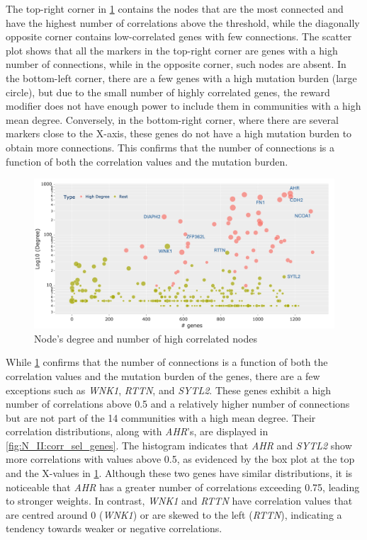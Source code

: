 The top-right corner in \cref{fig:N_II:degree_high_corr} contains the nodes that are the most connected and have the highest number of correlations above the threshold, while the diagonally opposite corner contains low-correlated genes with few connections. The scatter plot shows that all the markers in the top-right corner are genes with a high number of connections, while in the opposite corner, such nodes are absent. In the bottom-left corner, there are a few genes with a high mutation burden (large circle), but due to the small number of highly correlated genes, the reward modifier does not have enough power to include them in communities with a high mean degree. Conversely, in the bottom-right corner, where there are several markers close to the X-axis, these genes do not have a high mutation burden to obtain more connections. This confirms that the number of connections is a function of both the correlation values and the mutation burden.


\begin{figure}[!htb]    
    \centering
    \includegraphics[width=1.0\textwidth,height=1.0\textheight,keepaspectratio]{Sections/Network_II/resources/reward/Degree_highCorrGenes_labeled.png}
    \caption{Node's degree and number of high correlated nodes}
    \label{fig:N_II:degree_high_corr}
\end{figure}


While \cref{fig:N_II:degree_high_corr} confirms that the number of connections is a function of both the correlation values and the mutation burden of the genes, there are a few exceptions such as \textit{WNK1}, \textit{RTTN}, and \textit{SYTL2}. These genes exhibit a high number of correlations above 0.5 and a relatively higher number of connections but are not part of the 14 communities with a high mean degree. Their correlation distributions, along with \textit{AHR}'s, are displayed in \cref{fig:N_II:corr_sel_genes}. The histogram indicates that \textit{AHR} and \textit{SYTL2} show more correlations with values above 0.5, as evidenced by the box plot at the top and the X-values in \cref{fig:N_II:degree_high_corr}. Although these two genes have similar distributions, it is noticeable that \textit{AHR} has a greater number of correlations exceeding 0.75, leading to stronger weights. In contrast, \textit{WNK1} and \textit{RTTN} have correlation values that are centred around 0 (\textit{WNK1}) or are skewed to the left (\textit{RTTN}), indicating a tendency towards weaker or negative correlations.

